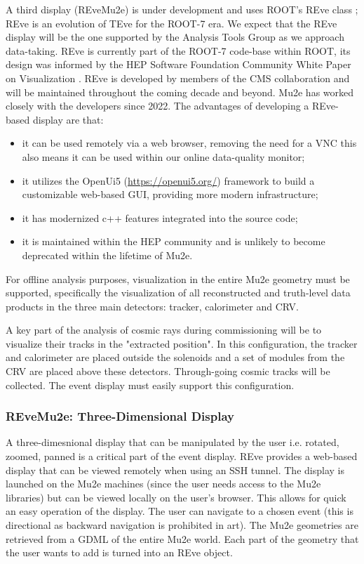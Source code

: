  A third display  (REveMu2e) is under development and uses ROOT's REve class \cite{Tadel:2020hlt}; REve is an evolution of TEve for the ROOT-7 era. We expect that the REve display will be the one supported by the Analysis Tools Group as we approach data-taking. REve is currently part of the ROOT-7 code-base within ROOT, its design was informed by the HEP Software Foundation Community White Paper on Visualization \cite{Bellis:2018hej}. REve is developed by members of the CMS collaboration and will be maintained throughout the coming decade and beyond. Mu2e has worked closely with the developers since 2022. The advantages of developing a REve-based display are that:

\begin{itemize}
    \item it can be used remotely via a web browser, removing the need for a VNC this also means it can be used within our online data-quality monitor;
    \item it utilizes the OpenUi5 (\url{https://openui5.org/}) framework to build a customizable web-based GUI, providing more modern infrastructure;
    \item it has modernized c++ features integrated into the source code;
    \item it is maintained within the HEP community and is unlikely to become deprecated within the lifetime of Mu2e.
\end{itemize}

For offline analysis purposes, visualization in the entire Mu2e geometry must be supported, specifically the visualization of all reconstructed and truth-level data products in the three main detectors: tracker, calorimeter and CRV.

A key part of the analysis of cosmic rays during commissioning will be to visualize their tracks in the "extracted position". In this configuration, the tracker and calorimeter are placed outside the solenoids and a set of modules from the CRV are placed above these detectors. Through-going cosmic tracks will be collected. The event display must easily support this configuration.

\subsubsection{REveMu2e: Three-Dimensional Display}

A three-dimesnional display that can be manipulated by the user i.e. rotated, zoomed, panned is a critical part of the event display. REve provides a web-based display that can be viewed remotely when using an SSH tunnel. The display is launched on the Mu2e machines (since the user needs access to the Mu2e libraries) but can be viewed locally on the user's browser. This allows for quick an easy operation of the display. The user can navigate to a chosen event (this is directional as backward navigation is prohibited in art). The Mu2e geometries are retrieved from a GDML of the entire Mu2e world. Each part of the geometry that the user wants to add is turned into an REve object.

